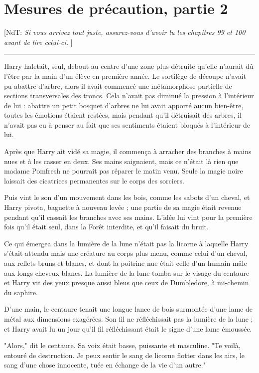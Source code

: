 
\chapter{Mesures de précaution, partie 2}

[NdT: \emph{Si vous arrivez tout juste, assurez-vous d'avoir lu les chapitres 99 et 100 avant de lire celui-ci.} ]
\par\noindent\rule{\textwidth}{0.4pt}
Harry haletait, seul, debout au centre d'une zone plus détruite qu'elle n'aurait dû l'être par la main d'un élève en première année. Le sortilège de découpe n'avait pu abattre d'arbre, alors il avait commencé une métamorphose partielle de sections transversales des troncs. Cela n'avait pas diminué la pression à l'intérieur de lui : abattre un petit bosquet d'arbres ne lui avait apporté aucun bien-être, toutes les émotions étaient restées, mais pendant qu'il détruisait des arbres, il n'avait pas eu à penser au fait que ses sentiments étaient bloqués à l'intérieur de lui.

Après que Harry ait vidé sa magie, il commença à arracher des branches à mains nues et à les casser en deux. Ses mains saignaient, mais ce n'était là rien que madame Pomfresh ne pourrait pas réparer le matin venu. Seule la magie noire laissait des cicatrices permanentes sur le corps des sorciers.

Puis vint le son d'un mouvement dans les bois, comme les sabots d'un cheval, et Harry pivota, baguette à nouveau levée ; une partie de sa magie était revenue pendant qu'il cassait les branches avec ses mains. L'idée lui vint pour la première fois qu'il était seul, dans la Forêt interdite, et qu'il faisait du bruit.

Ce qui émergea dans la lumière de la lune n'était pas la licorne à laquelle Harry s'était attendu mais une créature au corps plus menu, comme celui d'un cheval, aux reflets bruns et blancs, et dont la poitrine nue était celle d'un humain mâle aux longs cheveux blancs. La lumière de la lune tomba sur le visage du centaure et Harry vit des yeux presque aussi bleus que ceux de Dumbledore, à mi-chemin du saphire.

D'une main, le centaure tenait une longue lance de bois surmontée d'une lame de métal aux dimensions exagérées. Son fil ne réfléchissait pas la lumière de la lune ; et Harry avait lu un jour qu'il fil réfléchissant était le signe d'une lame émoussée.

"Alors," dit le centaure. Sa voix était basse, puissante et masculine. "Te voilà, entouré de destruction. Je peux sentir le sang de licorne flotter dans les airs, le sang d'une chose innocente, tuée en échange de la vie d'un autre."

